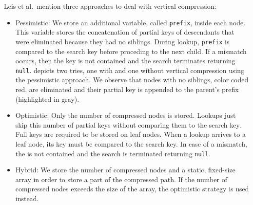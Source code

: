 \documentclass[abstracton,12pt]{scrartcl}
\theoremstyle{definition}
\begin{document}
Leis et al.\ mention three approaches to deal with vertical compression:
\begin{itemize}
  \item Pessimistic: We store an additional variable, called \texttt{prefix},
    inside each node. This variable stores the concatenation of partial keys
    of descendants that were eliminated because they had no siblings. During
    lookup, \texttt{prefix} is compared to the search key before proceding to
    the next child. If a mismatch occurs, then the key is not contained and
    the search terminates returning \texttt{null}.
     depicts two tries, one 
    with and one without vertical compression using the pessimistic approach.
    We observe that nodes with no siblings, color coded red, are eliminated 
    and their partial key is appended to the parent's prefix (highlighted in
    gray).

  \item Optimistic: Only the number of compressed nodes is stored. Lookups
    just skip this number of partial keys without comparing them to the search
    key. Full keys are required to be stored on leaf nodes. When a lookup 
    arrives to a leaf node, its key must be compared to the search key.
    In case of a mismatch, the is not contained and the search is terminated
    returning \texttt{null}.

  \item Hybrid: We store the number of compressed nodes and a static, 
    fixed-size array in order to store a part of the compressed path. If the 
    number of compressed nodes exceeds the size of the array, the optimistic 
    strategy is used instead.
\end{itemize}
\end{document}
